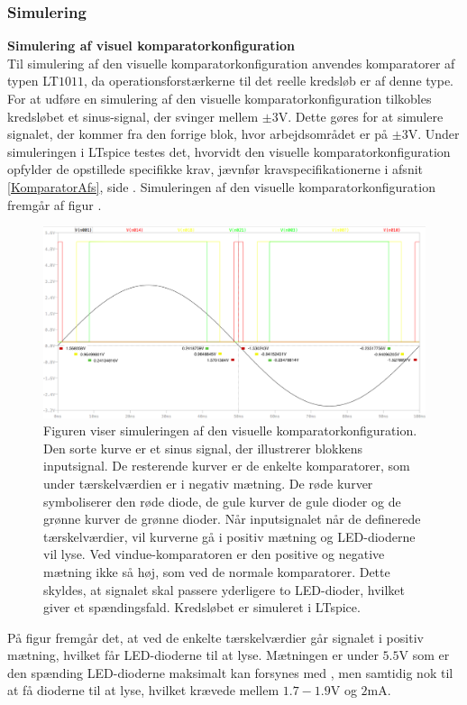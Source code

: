 \subsubsection{Simulering}
\noindent\textbf{Simulering af visuel komparatorkonfiguration} \\
Til simulering af den visuelle komparatorkonfiguration anvendes komparatorer af typen LT$1011$, da operationsforstærkerne til det reelle kredsløb er af denne type. For at udføre en simulering af den visuelle komparatorkonfiguration tilkobles kredsløbet et sinus-signal, der svinger mellem $\pm3$V. Dette gøres for at simulere signalet, der kommer fra den forrige blok, hvor arbejdsområdet er på $\pm3$V. Under simuleringen i LTspice testes det, hvorvidt den visuelle komparatorkonfiguration opfylder de opstillede specifikke krav, jævnfør kravspecifikationerne i afsnit \ref{KomparatorAfs}, side \pageref{KomparatorAfs}. Simuleringen af den visuelle komparatorkonfiguration fremgår af figur . 
\begin{figure}[H]
	\centering
	\includegraphics[scale=0.3]{figures/cProblemloesning/komparator_visuel_simulering_samlet1.PNG}
	\caption{Figuren viser simuleringen af den visuelle komparatorkonfiguration. Den sorte kurve er et sinus signal, der illustrerer blokkens inputsignal. De resterende kurver er de enkelte komparatorer, som under tærskelværdien er i negativ mætning. De røde kurver symboliserer den røde diode, de gule kurver de gule dioder og de grønne kurver de grønne dioder. Når inputsignalet når de definerede tærskelværdier, vil kurverne gå i positiv mætning og LED-dioderne vil lyse. Ved vindue-komparatoren er den positive og negative mætning ikke så høj, som ved de normale komparatorer. Dette skyldes, at signalet skal passere yderligere to LED-dioder, hvilket giver et spændingsfald. Kredsløbet er simuleret i LTspice.}
	\label{fig:komparator_visuel_simulering_samlet}
\end{figure}
På figur  fremgår det, at ved de enkelte tærskelværdier går signalet i positiv mætning, hvilket får LED-dioderne til at lyse. Mætningen er under $5.5$V som er den spænding LED-dioderne maksimalt kan forsynes med  , men samtidig nok til at få dioderne til at lyse, hvilket krævede mellem $1.7-1.9$V og $2$mA. 

